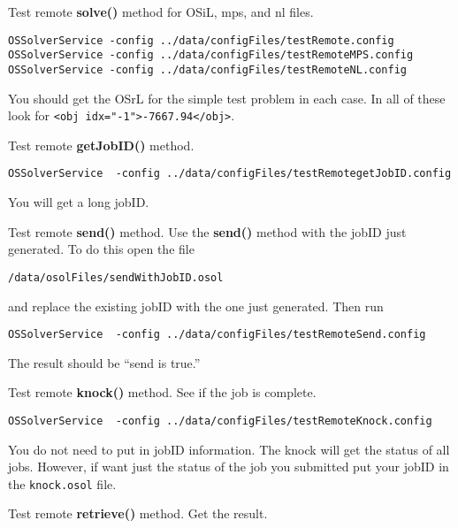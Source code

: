 \documentclass[11pt]{article}
\begin{document}
\begin{itemize}
\begin{itemize}
 Test remote {\bf solve()} method for OSiL, mps, and nl files.



\begin{verbatim}
OSSolverService -config ../data/configFiles/testRemote.config
OSSolverService -config ../data/configFiles/testRemoteMPS.config
OSSolverService -config ../data/configFiles/testRemoteNL.config
\end{verbatim}


You should get the OSrL for the simple test problem in each case.  In all of these look for {\tt <obj idx="-1">-7667.94</obj>}.

\vskip 10pt


 Test remote {\bf getJobID()} method.


\begin{verbatim}
OSSolverService  -config ../data/configFiles/testRemotegetJobID.config
\end{verbatim}



You will get a long jobID.


\vskip 10pt


 Test remote {\bf send()} method. Use the {\bf send()} method with the jobID just  generated.  To do this open the file
\begin{verbatim}
/data/osolFiles/sendWithJobID.osol
\end{verbatim}
and replace the existing jobID with the one just generated.  Then run
\begin{verbatim}
OSSolverService  -config ../data/configFiles/testRemoteSend.config
\end{verbatim}
The result should be ``send is true.''

\vskip 10pt

 Test remote {\bf knock()} method.  See if the  job is complete.


\begin{verbatim}
OSSolverService  -config ../data/configFiles/testRemoteKnock.config
\end{verbatim}

You do not need to put in jobID information. The knock will get the status of all jobs. However, if want just the status of the job you submitted put your jobID in the {\tt knock.osol} file. 

\vskip 10pt

 Test remote {\bf retrieve()} method. Get the result.


\end{itemize}
\end{itemize}
\end{document}
